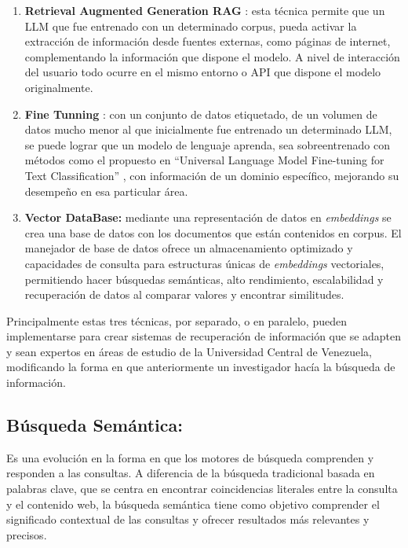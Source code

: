 \documentclass[
  12pt,
  openany]{book}
\begin{document}
\begin{enumerate}
\def\labelenumi{\arabic{enumi}.}
\item
  \textbf{Retrieval Augmented Generation RAG} \citep{lewis2020}: esta técnica permite que un LLM que fue entrenado con un determinado corpus, pueda activar la extracción de información desde fuentes externas, como páginas de internet, complementando la información que dispone el modelo. A nivel de interacción del usuario todo ocurre en el mismo entorno o API que dispone el modelo originalmente.
\item
  \textbf{Fine Tunning} \citep{lv2023}: con un conjunto de datos etiquetado, de un volumen de datos mucho menor al que inicialmente fue entrenado un determinado LLM, se puede lograr que un modelo de lenguaje aprenda, sea sobreentrenado con métodos como el propuesto en ``Universal Language Model Fine-tuning for Text Classification'' \citep{howard2018}, con información de un dominio específico, mejorando su desempeño en esa particular área.
\item
  \textbf{Vector DataBase:} mediante una representación de datos en \emph{embeddings} se crea una base de datos con los documentos que están contenidos en corpus. El manejador de base de datos ofrece un almacenamiento optimizado y capacidades de consulta para estructuras únicas de \emph{embeddings} vectoriales, permitiendo hacer búsquedas semánticas, alto rendimiento, escalabilidad y recuperación de datos al comparar valores y encontrar similitudes.
\end{enumerate}

Principalmente estas tres técnicas, por separado, o en paralelo, pueden implementarse para crear sistemas de recuperación de información que se adapten y sean expertos en áreas de estudio de la Universidad Central de Venezuela, modificando la forma en que anteriormente un investigador hacía la búsqueda de información.

\hypertarget{busquedasemantica}{%
\subsection{Búsqueda Semántica:}\label{busquedasemantica}}

Es una evolución en la forma en que los motores de búsqueda comprenden y responden a las consultas. A diferencia de la búsqueda tradicional basada en palabras clave, que se centra en encontrar coincidencias literales entre la consulta y el contenido web, la búsqueda semántica tiene como objetivo comprender el significado contextual de las consultas y ofrecer resultados más relevantes y precisos.
\end{document}
